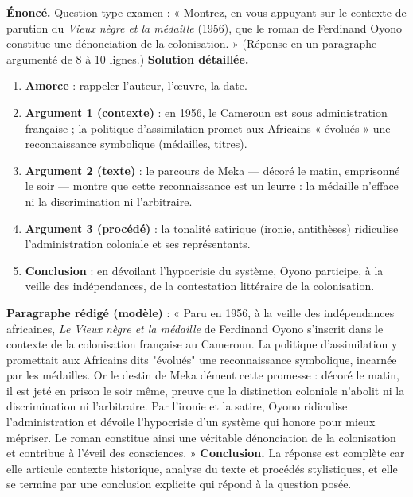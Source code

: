 \documentclass[11pt]{article}
\begin{document}
\begin{exoresolu}
\textbf{Énoncé.} Question type examen : « Montrez, en vous appuyant sur le contexte de parution du \emph{Vieux nègre et la médaille} (1956), que le roman de Ferdinand Oyono constitue une dénonciation de la colonisation. » (Réponse en un paragraphe argumenté de 8 à 10 lignes.)
\tcblower
\textbf{Solution détaillée.}
\begin{enumerate}
\item \textbf{Amorce} : rappeler l'auteur, l'œuvre, la date.
\item \textbf{Argument 1 (contexte)} : en 1956, le Cameroun est sous administration française ; la politique d'assimilation promet aux Africains « évolués » une reconnaissance symbolique (médailles, titres).
\item \textbf{Argument 2 (texte)} : le parcours de Meka — décoré le matin, emprisonné le soir — montre que cette reconnaissance est un leurre : la médaille n'efface ni la discrimination ni l'arbitraire.
\item \textbf{Argument 3 (procédé)} : la tonalité satirique (ironie, antithèses) ridiculise l'administration coloniale et ses représentants.
\item \textbf{Conclusion} : en dévoilant l'hypocrisie du système, Oyono participe, à la veille des indépendances, de la contestation littéraire de la colonisation.
\end{enumerate}
\textbf{Paragraphe rédigé (modèle)} : « Paru en 1956, à la veille des indépendances africaines, \emph{Le Vieux nègre et la médaille} de Ferdinand Oyono s'inscrit dans le contexte de la colonisation française au Cameroun. La politique d'assimilation y promettait aux Africains dits "évolués" une reconnaissance symbolique, incarnée par les médailles. Or le destin de Meka dément cette promesse : décoré le matin, il est jeté en prison le soir même, preuve que la distinction coloniale n'abolit ni la discrimination ni l'arbitraire. Par l'ironie et la satire, Oyono ridiculise l'administration et dévoile l'hypocrisie d'un système qui honore pour mieux mépriser. Le roman constitue ainsi une véritable dénonciation de la colonisation et contribue à l'éveil des consciences. »
\textbf{Conclusion.} La réponse est complète car elle articule contexte historique, analyse du texte et procédés stylistiques, et elle se termine par une conclusion explicite qui répond à la question posée.
\end{exoresolu}
\end{document}
